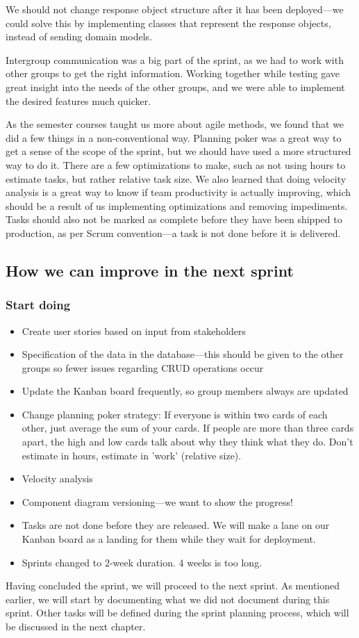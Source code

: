 We should not change response object structure after it has been deployed---we could solve this by implementing classes that represent the response objects, instead of sending domain models. 

Intergroup communication was a big part of the sprint, as we had to work with other groups to get the right information. 
Working together while testing gave great insight into the needs of the other groups, and we were able to implement the desired features much quicker.

As the semester courses taught us more about agile methods, we found that we did a few things in a non-conventional way. Planning poker was a great way to get a sense of the scope of the sprint, but we should have used a more structured way to do it. 
There are a few optimizations to make, such as not using hours to estimate tasks, but rather relative task size.
We also learned that doing velocity analysis is a great way to know if team productivity is actually improving, which should be a result of us implementing optimizations and removing impediments.
Tasks should also not be marked as complete before they have been shipped to production, as per Scrum convention---a task is not done before it is delivered\cite{sutherlandScrumArtDoing2014}.

\subsection{How we can improve in the next sprint}

\subsubsection{Start doing}

\begin{itemize}
    \item Create user stories based on input from stakeholders
    \item Specification of the data in the database---this should be given to the other groups so fewer issues regarding CRUD operations occur
    \item Update the Kanban board frequently, so group members always are updated
    \item Change planning poker strategy:
    \subitem If everyone is within two cards of each other, just average the sum of your cards.
    \subitem If people are more than three cards apart, the high and low cards talk about why they think what they do.
    \subitem Don't estimate in hours, estimate in 'work' (relative size).
    \item Velocity analysis
    \item Component diagram versioning---we want to show the progress!
    \item Tasks are not done before they are released. We will make a lane on our Kanban board as a landing for them while they wait for deployment.
    \item Sprints changed to 2-week duration. 4 weeks is too long.
\end{itemize}

Having concluded the sprint, we will proceed to the next sprint. As mentioned earlier, we will start by documenting what we did not document during this sprint. 
Other tasks will be defined during the sprint planning process, which will be discussed in the next chapter.